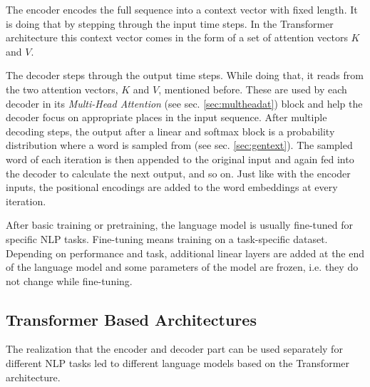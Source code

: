 The encoder encodes the full sequence into a context vector with fixed length. It is doing that by stepping through the input time steps. In the Transformer architecture this context vector comes in the form of a set of attention vectors $K$ and $V$. 

The decoder steps through the output time steps. While doing that, it reads from the two attention vectors, $K$ and $V$, mentioned before. These are used by each decoder in its \textit{Multi-Head Attention} (see sec. \ref{sec:multheadat}) block and help the decoder focus on appropriate places in the input sequence. After multiple decoding steps, the output after a linear and softmax block is a probability distribution where a word is sampled from (see sec. \ref{sec:gentext}). The sampled word of each iteration is then appended to the original input and again fed into the decoder to calculate the next output, and so on. Just like with the encoder inputs, the positional encodings are added to the word embeddings at every iteration. 

After basic training or pretraining, the language model is usually fine-tuned for specific NLP tasks. Fine-tuning means training on a task-specific dataset. Depending on performance and task, additional linear layers are added at the end of the language model and some parameters of the model are frozen, i.e. they do not change while fine-tuning. \cite{trafoarch}

\subsection{Transformer Based Architectures}
The realization that the encoder and decoder part can be used separately for different NLP tasks led to different language models based on the Transformer architecture. 

